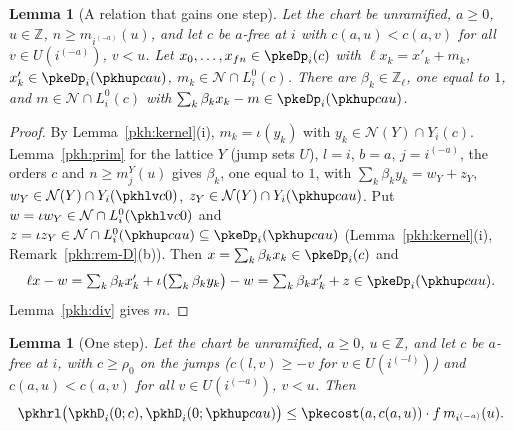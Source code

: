 \documentclass[10pt]{amsart}
\newtheorem{lemma}[theorem]{Lemma}
\theoremstyle{definition}
\theoremstyle{remark}
\newcommand{\Z}{\mathbb Z}
\begin{document}
\begin{lemma}[A relation that gains one step]\label{pkh:raw}
Let the chart be unramified, $a\ge0$, $u\in\Z$, $n\ge m_{i^{(-a)}}(u)$, and let $c$ be $a$-free at $i$ with
$c(a,u)<c(a,v)$ for all $v\in U(i^{(-a)})$, $v<u$. Let $x_0,\dots,x_{fn}\in\pkeDp_i(c)$ with $\ell x_k=x'_k+m_k$,
$x'_k\in\pkeDp_i(\pkhup cau)$, $m_k\in\mathcal N\cap L^0_i(c)$. There are $\beta_k\in\Z_\ell$, one equal to $1$,
and $m\in\mathcal N\cap L^0_i(c)$ with $\sum_k\beta_kx_k-m\in\pkeDp_i(\pkhup cau)$.
\end{lemma}

\begin{proof}
By Lemma~\ref{pkh:kernel}(i), $m_k=\iota(y_k)$ with $y_k\in\mathcal N(Y)\cap Y_i(c)$. Lemma~\ref{pkh:prim} for
the lattice $Y$ (jump sets $U$), $l=i$, $b=a$, $j=i^{(-a)}$, the orders $c$ and $n\ge m^Y_j(u)$ gives
$\beta_k$, one equal to $1$, with $\sum_k\beta_ky_k=w_Y+z_Y$, $w_Y\in\mathcal N(Y)\cap Y_i(\pkhlv c0)$, $z_Y\in
\mathcal N(Y)\cap Y_i(\pkhup cau)$. Put $w=\iota w_Y\in\mathcal N\cap L^0_i(\pkhlv c0)$ and $z=\iota z_Y\in
\mathcal N\cap L^0_i(\pkhup cau)\subseteq\pkeDp_i(\pkhup cau)$ (Lemma~\ref{pkh:kernel}(i),
Remark~\ref{pkh:rem-D}(b)). Then $x=\sum_k\beta_kx_k\in\pkeDp_i(c)$ and
\[
\textstyle\ell x-w=\sum_k\beta_kx'_k+\iota\bigl(\sum_k\beta_ky_k\bigr)-w=\sum_k\beta_kx'_k+z\in
\pkeDp_i(\pkhup cau).
\]
Lemma~\ref{pkh:div} gives $m$.
\end{proof}

\begin{lemma}[One step]\label{pkh:one}
Let the chart be unramified, $a\ge0$, $u\in\Z$, and let $c$ be $a$-free at $i$, with $c\ge\rho_0$ on the jumps
($c(l,v)\ge-v$ for $v\in U(i^{(-l)})$) and $c(a,u)<c(a,v)$ for all $v\in U(i^{(-a)})$, $v<u$. Then
\[
\pkhrl\bigl(\pkhD_i(0;c),\pkhD_i(0;\pkhup cau)\bigr)\le\pkecost(a,c(a,u))\cdot f\,m_{i^{(-a)}}(u).
\]
\end{lemma}
\end{document}
